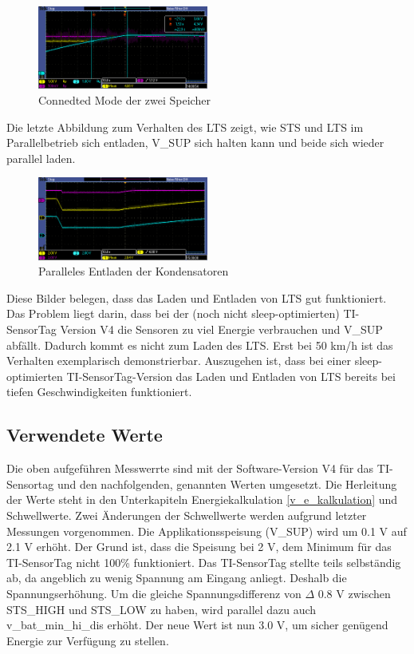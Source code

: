 \begin{figure}[ht]
   \includegraphics[width=0.5\textwidth]{4Resultate/imag/STS_LTS_connect.PNG}
    \caption{Connedted Mode der zwei Speicher}
    \label{connected_mode}
\end{figure}

Die letzte Abbildung zum Verhalten des LTS zeigt, wie STS und LTS im Parallelbetrieb sich entladen, V\_SUP sich halten kann und beide sich wieder parallel laden. 

\begin{figure}[ht]
   \includegraphics[width=0.5\textwidth]{4Resultate/imag/pic1.PNG}
    \caption{Paralleles Entladen der Kondensatoren}
    \label{parallel_entladen}
\end{figure}

Diese Bilder belegen, dass das Laden und Entladen von LTS gut funktioniert. Das Problem liegt darin, dass bei der (noch nicht sleep-optimierten) TI-SensorTag Version V4 die Sensoren zu viel Energie verbrauchen und V\_SUP abfällt. Dadurch kommt es nicht zum Laden des LTS. Erst bei 50 km/h ist das Verhalten exemplarisch demonstrierbar. Auszugehen ist, dass bei einer sleep-optimierten TI-SensorTag-Version das Laden und Entladen von LTS bereits bei tiefen Geschwindigkeiten funktioniert.

\subsection{Verwendete Werte}
\label{werte}

Die oben aufgeführen Messwerrte sind mit der Software-Version V4 für das TI-Sensortag und den nachfolgenden, genannten Werten umgesetzt. Die Herleitung der Werte steht in den Unterkapiteln Energiekalkulation \ref{v_e_kalkulation} und Schwellwerte. Zwei Änderungen der Schwellwerte werden aufgrund letzter Messungen vorgenommen. Die Applikationsspeisung (V\_SUP) wird um 0.1 V auf 2.1 V erhöht. Der Grund ist, dass die Speisung bei 2 V, dem Minimum für das TI-SensorTag nicht 100\thinspace\% funktioniert. Das TI-SensorTag stellte teils selbständig ab, da angeblich zu wenig Spannung am Eingang anliegt. Deshalb die Spannungserhöhung. Um die gleiche Spannungsdifferenz von $\Delta$ 0.8 V zwischen STS\_HIGH und STS\_LOW zu haben, wird parallel dazu auch  v\_bat\_min\_hi\_dis erhöht. Der neue Wert ist nun 3.0 V, um sicher genügend Energie zur Verfügung zu stellen.

